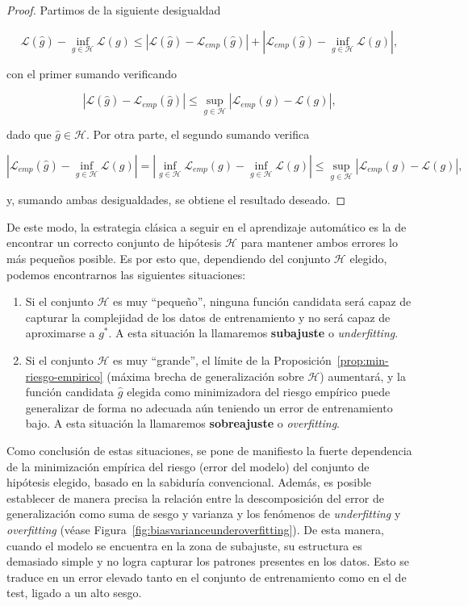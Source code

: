 \begin{proof}
    Partimos de la siguiente desigualdad

    \[ \mathcal{L}(\hat{g}) - \inf_{g \in \mathcal{H}}\mathcal{L}(g) \leq  |\mathcal{L}(\hat{g}) - \mathcal{L}_{emp}(\hat{g})| + |\mathcal{L}_{emp}(\hat{g}) - \inf_{g \in \mathcal{H}}\mathcal{L}(g)|, \]

    con el primer sumando verificando

    \[ |\mathcal{L}(\hat{g}) - \mathcal{L}_{emp}(\hat{g})| \leq \sup_{g \in \mathcal{H}}|\mathcal{L}_{emp}(g) - \mathcal{L}(g)|, \]

    dado que $\hat{g} \in \mathcal{H}$. Por otra parte, el segundo sumando verifica

    \[ |\mathcal{L}_{emp}(\hat{g}) - \inf_{g \in \mathcal{H}}\mathcal{L}(g)| = |\inf_{g \in \mathcal{H}} \mathcal{L}_{emp}(g) - \inf_{g \in \mathcal{H}}\mathcal{L}(g)| \leq \sup_{g \in \mathcal{H}}|\mathcal{L}_{emp}(g) - \mathcal{L}(g)|, \]

    y, sumando ambas desigualdades, se obtiene el resultado deseado.
\end{proof}

De este modo, la estrategia clásica a seguir en el aprendizaje automático es la de encontrar un correcto conjunto de hipótesis $\mathcal{H}$ para mantener ambos errores lo más pequeños posible. Es por esto que, dependiendo del conjunto $\mathcal{H}$ elegido, podemos encontrarnos las siguientes situaciones:

\begin{enumerate}
    \item Si el conjunto $\mathcal{H}$ es muy ``pequeño'', ninguna función candidata será capaz de capturar la complejidad de los datos de entrenamiento y no será capaz de aproximarse a $g^{*}$. A esta situación la llamaremos \textbf{subajuste} o \emph{underfitting}.
    \item Si el conjunto $\mathcal{H}$ es muy ``grande'', el límite de la Proposición~\ref{prop:min-riesgo-empirico} (máxima brecha de generalización sobre $\mathcal{H}$) aumentará, y la función candidata $\hat{g}$ elegida como minimizadora del riesgo empírico puede generalizar de forma no adecuada aún teniendo un error de entrenamiento bajo. A esta situación la llamaremos \textbf{sobreajuste} o \emph{overfitting}.
\end{enumerate}

Como conclusión de estas situaciones, se pone de manifiesto la fuerte dependencia de la minimización empírica del riesgo (error del modelo) del conjunto de hipótesis elegido, basado en la sabiduría convencional. Además, es posible establecer de manera precisa la relación entre la descomposición del error de generalización como suma de sesgo y varianza y los fenómenos de \emph{underfitting} y \emph{overfitting} (véase Figura~\ref{fig:biasvarianceunderoverfitting}). De esta manera, cuando el modelo se encuentra en la zona de subajuste, su estructura es demasiado simple y no logra capturar los patrones presentes en los datos. Esto se traduce en un error elevado tanto en el conjunto de entrenamiento como en el de test, ligado a un alto sesgo.

